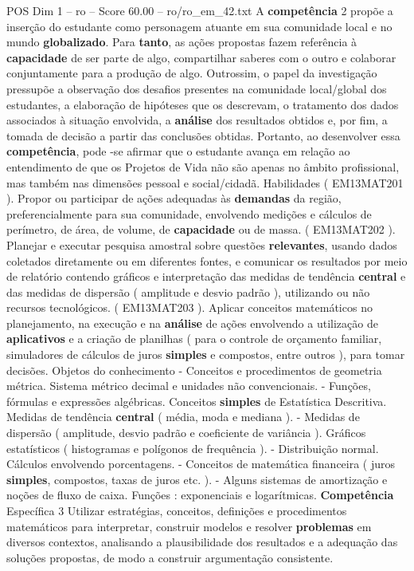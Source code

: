 \begin{textsample}{POS Dim 1 – ro – Score 60.00 – ro/ro\_em\_42.txt}
A \textbf{competência} 2 propõe a inserção do estudante como personagem atuante em sua comunidade local e no mundo \textbf{globalizado}.
Para \textbf{tanto}, as ações propostas fazem referência à \textbf{capacidade} de ser parte de algo, compartilhar saberes com o outro e colaborar conjuntamente para a produção de algo.
Outrossim, o papel da investigação pressupõe a observação dos desafios presentes na comunidade local/global dos estudantes, a elaboração de hipóteses que os descrevam, o tratamento dos dados associados à situação envolvida, a \textbf{análise} dos resultados obtidos e, por fim, a tomada de decisão a partir das conclusões obtidas.
Portanto, ao desenvolver essa \textbf{competência}, pode -se afirmar que o estudante avança em relação ao entendimento de que os Projetos de Vida não são apenas no âmbito profissional, mas também nas dimensões pessoal e social/cidadã.
Habilidades ( EM13MAT201 ).
Propor ou participar de ações adequadas às \textbf{demandas} da região, preferencialmente para sua comunidade, envolvendo medições e cálculos de perímetro, de área, de volume, de \textbf{capacidade} ou de massa. ( EM13MAT202 ).
Planejar e executar pesquisa amostral sobre questões \textbf{relevantes}, usando dados coletados diretamente ou em diferentes fontes, e comunicar os resultados por meio de relatório contendo gráficos e interpretação das medidas de tendência \textbf{central} e das medidas de dispersão ( amplitude e desvio padrão ), utilizando ou não recursos tecnológicos. ( EM13MAT203 ).
Aplicar conceitos matemáticos no planejamento, na execução e na \textbf{análise} de ações envolvendo a utilização de \textbf{aplicativos} e a criação de planilhas ( para o controle de orçamento familiar, simuladores de cálculos de juros \textbf{simples} e compostos, entre outros ), para tomar decisões.
Objetos do conhecimento - Conceitos e procedimentos de geometria métrica.
Sistema métrico decimal e unidades não convencionais. - Funções, fórmulas e expressões algébricas.
Conceitos \textbf{simples} de Estatística Descritiva.
Medidas de tendência \textbf{central} ( média, moda e mediana ). - Medidas de dispersão ( amplitude, desvio padrão e coeficiente de variância ).
Gráficos estatísticos ( histogramas e polígonos de frequência ). - Distribuição normal.
Cálculos envolvendo porcentagens. - Conceitos de matemática financeira ( juros \textbf{simples}, compostos, taxas de juros etc. ). - Alguns sistemas de amortização e noções de fluxo de caixa.
Funções : exponenciais e logarítmicas. \textbf{Competência} Específica 3 Utilizar estratégias, conceitos, definições e procedimentos matemáticos para interpretar, construir modelos e resolver \textbf{problemas} em diversos contextos, analisando a plausibilidade dos resultados e a adequação das soluções propostas, de modo a construir argumentação consistente.

\end{textsample}
